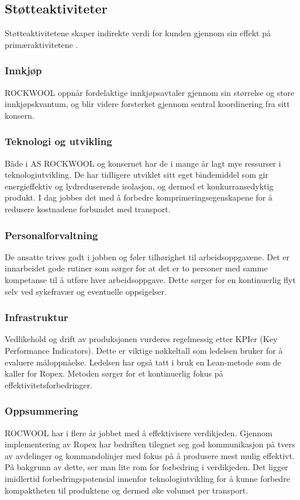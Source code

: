 \subsection{Støtteaktiviteter}
Støtteaktivitetene skaper indirekte verdi for kunden gjennom sin effekt på primæraktivitetene \cite[s.~132]{FjeldstadogLunnan2018}. 

\subsubsection*{Innkjøp}
ROCKWOOL oppnår fordelaktige innkjøpsavtaler gjennom sin størrelse og store innkjøpskvantum, og blir videre forsterket gjennom sentral koordinering fra sitt konsern.

\subsubsection*{Teknologi og utvikling}
Både i AS ROCKWOOL og konsernet har de i mange år lagt mye ressurser i teknologiutvikling. De har tidligere utviklet sitt eget bindemiddel som gir energieffektiv og lydreduserende isolasjon, og dermed et konkurransedyktig produkt. I dag jobbes det med å forbedre komprimeringsegenskapene for å redusere kostnadene forbundet med transport.

\subsubsection*{Personalforvaltning}
De ansatte trives godt i jobben og føler tilhørighet til arbeidsoppgavene. Det er innarbeidet gode rutiner som sørger for at det er to personer med samme kompetanse til å utføre hver arbeidsoppgave. Dette sørger for en kontinuerlig flyt selv ved sykefravær og eventuelle oppsigelser.

\subsubsection*{Infrastruktur}
Vedlikehold og drift av produksjonen vurderes regelmessig etter KPIer (Key Performance Indicators). Dette er viktige nøkkeltall som ledelsen bruker for å evaluere måloppnåelse. Ledelsen har også tatt i bruk en Lean-metode som de kaller for Ropex. Metoden sørger for et kontinuerlig fokus på effektivitetsforbedringer.

\subsubsection*{Oppsummering}
ROCWOOL har i flere år jobbet med å effektivisere verdikjeden. Gjennom implementering av Ropex har bedriften tilegnet seg god kommunikasjon på tvers av avdelinger og kommandolinjer med fokus på å produsere mest mulig effektivt. På bakgrunn av dette, ser man lite rom for forbedring i verdikjeden. Det ligger imidlertid forbedringspotensial innenfor teknologiutvikling for å kunne forbedre kompaktheten til produktene og dermed øke volumet per transport.

